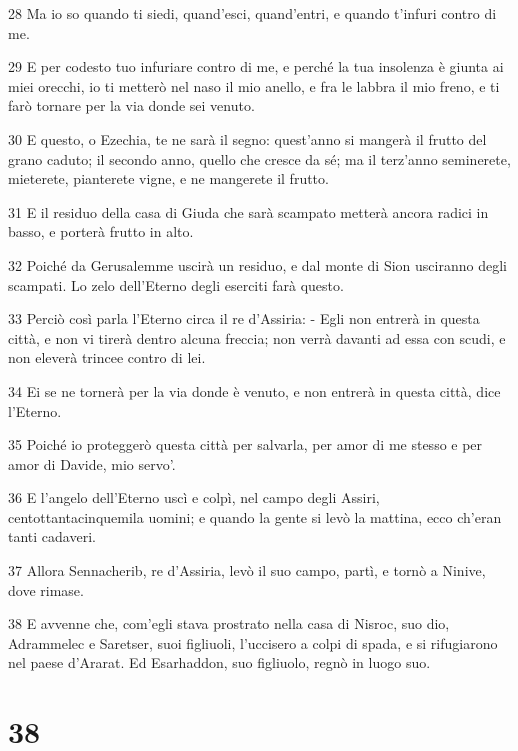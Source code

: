 \par 28 Ma io so quando ti siedi, quand'esci, quand'entri, e quando t'infuri contro di me.
\par 29 E per codesto tuo infuriare contro di me, e perché la tua insolenza è giunta ai miei orecchi, io ti metterò nel naso il mio anello, e fra le labbra il mio freno, e ti farò tornare per la via donde sei venuto.
\par 30 E questo, o Ezechia, te ne sarà il segno: quest'anno si mangerà il frutto del grano caduto; il secondo anno, quello che cresce da sé; ma il terz'anno seminerete, mieterete, pianterete vigne, e ne mangerete il frutto.
\par 31 E il residuo della casa di Giuda che sarà scampato metterà ancora radici in basso, e porterà frutto in alto.
\par 32 Poiché da Gerusalemme uscirà un residuo, e dal monte di Sion usciranno degli scampati. Lo zelo dell'Eterno degli eserciti farà questo.
\par 33 Perciò così parla l'Eterno circa il re d'Assiria: - Egli non entrerà in questa città, e non vi tirerà dentro alcuna freccia; non verrà davanti ad essa con scudi, e non eleverà trincee contro di lei.
\par 34 Ei se ne tornerà per la via donde è venuto, e non entrerà in questa città, dice l'Eterno.
\par 35 Poiché io proteggerò questa città per salvarla, per amor di me stesso e per amor di Davide, mio servo'.
\par 36 E l'angelo dell'Eterno uscì e colpì, nel campo degli Assiri, centottantacinquemila uomini; e quando la gente si levò la mattina, ecco ch'eran tanti cadaveri.
\par 37 Allora Sennacherib, re d'Assiria, levò il suo campo, partì, e tornò a Ninive, dove rimase.
\par 38 E avvenne che, com'egli stava prostrato nella casa di Nisroc, suo dio, Adrammelec e Saretser, suoi figliuoli, l'uccisero a colpi di spada, e si rifugiarono nel paese d'Ararat. Ed Esarhaddon, suo figliuolo, regnò in luogo suo.

\chapter{38}

